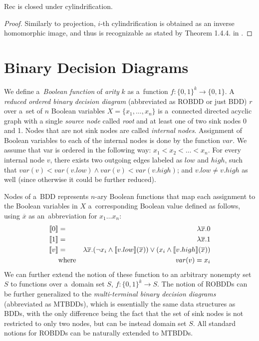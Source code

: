 \begin{lemma}
Rec is closed under cylindrification.
\end{lemma}

\begin{proof}
 Similarly to projection, $i$-th cylindrification is obtained as an inverse
 homomorphic image, and thus is recognizable as stated by Theorem 1.4.4. in
 \cite{tata}.
\end{proof}

 \section{Binary Decision Diagrams}\label{bdd}

We define a~\emph{Boolean function} of \emph{arity} $k$ as a~function $f :
\{0,1\}^k \longrightarrow \{0,1\}$. A \emph{reduced ordered binary decision
diagram} (abbreviated as ROBDD or just BDD) $r$ over a~set of $n$ Boolean
variables $X = \{x_1,\ldots,x_n\}$ is a~connected directed acyclic graph with a
single \emph{source node} called \emph{root} and at least one of two sink nodes
0 and 1. Nodes that are not sink nodes are called \emph{internal nodes}.
Assignment of Boolean variables to each of the internal nodes is done by the
function $\mathit{var}$. We assume that var is ordered in the following way: $x_1 < x_2 <
\ldots < x_n$.
For every internal node $v$, there exists two outgoing edges labeled as $low$
and $\mathit{high}$, such that $\mathit{var}(v) < \mathit{var}(v.low) \wedge \mathit{var}(v) <
\mathit{var}(v.high)$; and $v.low \neq v.high$ as well (since otherwise it could be further reduced).

Nodes of a~BDD represents $n$-ary Boolean functions that map each assignment to
the Boolean variables in $X$ a~corresponding Boolean value defined as follows,
using $\overline{x}$ as an~abbreviation for $x_1\ldots x_n$:
\begin{eqnarray*}
 \text{\textlbrackdbl} 0\text{\textrbrackdbl} & = & \lambda\overline{x}.0\\
 \text{\textlbrackdbl} 1\text{\textrbrackdbl} & = & \lambda\overline{x}.1\\
 \text{\textlbrackdbl} v\text{\textrbrackdbl} & = & \lambda\overline{x}.(\neg
 x_i \wedge \text{\textlbrackdbl} v.low\text{\textrbrackdbl}(\overline{x})) \vee
 (x_i \wedge \text{\textlbrackdbl} v.high\text{\textrbrackdbl}(\overline{x}))\\
       & \text{where} & \mathit{var}(v) = x_i
\end{eqnarray*}
\newpage
We can further extend the notion of these function to an arbitrary nonempty set
$S$ to functions over a~domain set $S$, $f : \{0,1\}^k \longrightarrow S$. The
notion of ROBDDs can be further generalized to the \emph{multi-terminal binary
decision diagrams} (abbreviated as MTBDDs), which is essentially the same data
structures as BDDs, with the only difference being the fact that the set of sink
nodes is not restricted to only two nodes, but can be instead domain set $S$.
All standard notions for ROBDDs can be naturally extended to MTBDDs.

